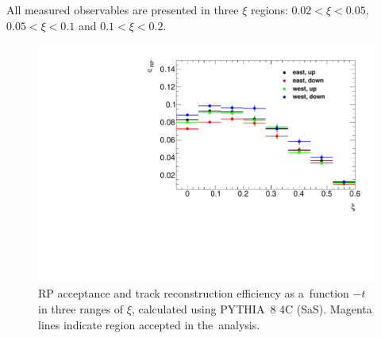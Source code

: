 All measured observables are presented in three $\xi$ regions: $0.02<\xi<0.05$, $0.05<\xi<0.1$ and $0.1<\xi<0.2$.
\begin{figure}[h!]
	\centering
	\includegraphics[width=\textwidth, page=4]{chapters/dataSampleSTAR/img/rpeffi.pdf}
	\caption{RP acceptance and track reconstruction efficiency as a~function $-t$ in three ranges of $\xi$, calculated using PYTHIA~8 4C (SaS). Magenta lines indicate region accepted in the~analysis.}
	\label{fig:STARAcceptance}
\end{figure}

\FloatBarrier

